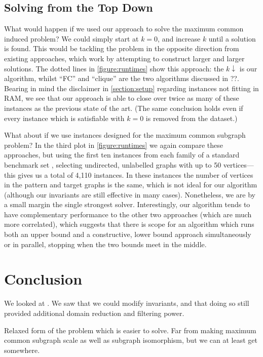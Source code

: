 \documentclass[letterpaper]{article}
\newcommand{\citep}[1]{\cite{#1}}
\theoremstyle{definition}
\begin{document}
\subsection{Solving from the Top Down}

What would happen if we used our approach to solve the maximum common induced problem? We could
simply start at $k = 0$, and increase $k$ until a solution is found. This would be tackling the
problem in the opposite direction from existing approaches, which work by attempting to construct
larger and larger solutions. The dotted lines in \cref{figure:runtimes} show this approach: the $k
\downarrow$ is our algorithm, whilst ``FC'' and ``clique'' are the two algorithms discussed in ??.
Bearing in mind the disclaimer in \cref{section:setup} regarding instances not fitting in RAM, we
see that our approach is able to close over twice as many of these instances as the previous state
of the art. (The same conclusion holds even if every instance which is satisfiable with $k = 0$ is
removed from the dataset.)

What about if we use instances designed for the maximum common subgraph problem? In the third plot
in \cref{figure:runtimes} we again compare these approaches, but using the first ten instances from
each family of a standard benchmark set
\citep{DBLP:journals/prl/SantoFSV03,DBLP:journals/jgaa/ConteFV07}, selecting undirected, unlabelled
graphs with up to 50 vertices---this gives us a total of 4,110 instances. In these instances the
number of vertices in the pattern and target graphs is the same, which is not ideal for our
algorithm (although our invariants are still effective in many cases). Nonetheless, we are by a
small margin the single strongest solver. Interestingly, our algorithm tends to have complementary
performance to the other two approaches (which are much more correlated), which suggests that there
is scope for an algorithm which runs both an upper bound and a constructive, lower bound approach
simultaneously or in parallel, stopping when the two bounds meet in the middle.

\section{Conclusion}

We looked at . We saw that we could modify invariants, and that doing so still provided additional
domain reduction and filtering power.

Relaxed form of the problem which is easier to solve. Far from making maximum common subgraph scale
as well as subgraph isomorphism, but we can at least get somewhere.
\end{document}
